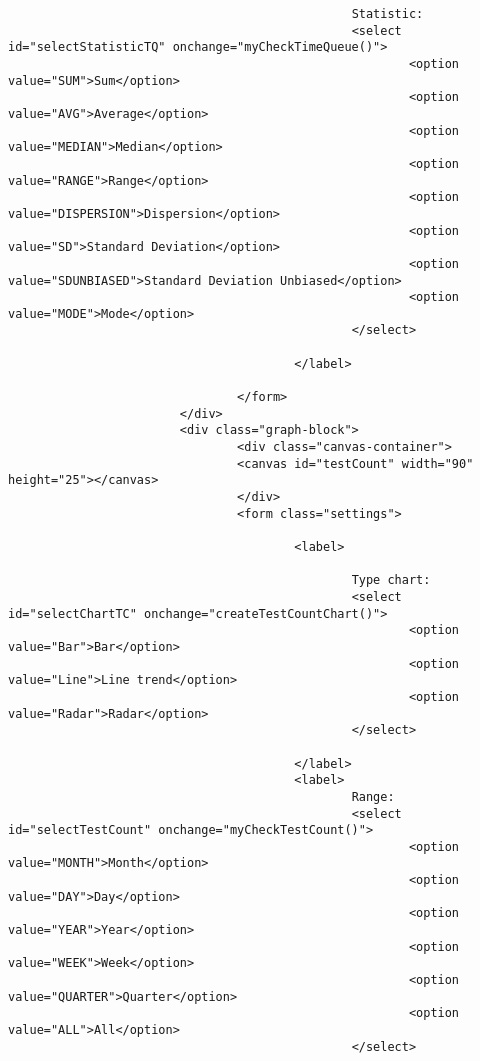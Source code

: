 \begin{lstlisting}
                                                Statistic:
                                                <select id="selectStatisticTQ" onchange="myCheckTimeQueue()">
                                                        <option value="SUM">Sum</option>
                                                        <option value="AVG">Average</option>
                                                        <option value="MEDIAN">Median</option>
                                                        <option value="RANGE">Range</option>
                                                        <option value="DISPERSION">Dispersion</option>
                                                        <option value="SD">Standard Deviation</option>
                                                        <option value="SDUNBIASED">Standard Deviation Unbiased</option>
                                                        <option value="MODE">Mode</option>
                                                </select>

                                        </label>

                                </form>
                        </div>
                        <div class="graph-block">
                                <div class="canvas-container">
                                <canvas id="testCount" width="90" height="25"></canvas>
                                </div>
                                <form class="settings">

                                        <label>

                                                Type chart:
                                                <select id="selectChartTC" onchange="createTestCountChart()">
                                                        <option value="Bar">Bar</option>
                                                        <option value="Line">Line trend</option>
                                                        <option value="Radar">Radar</option>
                                                </select>

                                        </label>
                                        <label>
                                                Range:
                                                <select id="selectTestCount" onchange="myCheckTestCount()">
                                                        <option value="MONTH">Month</option>
                                                        <option value="DAY">Day</option>
                                                        <option value="YEAR">Year</option>
                                                        <option value="WEEK">Week</option>
                                                        <option value="QUARTER">Quarter</option>
                                                        <option value="ALL">All</option>
                                                </select>


\end{lstlisting}
